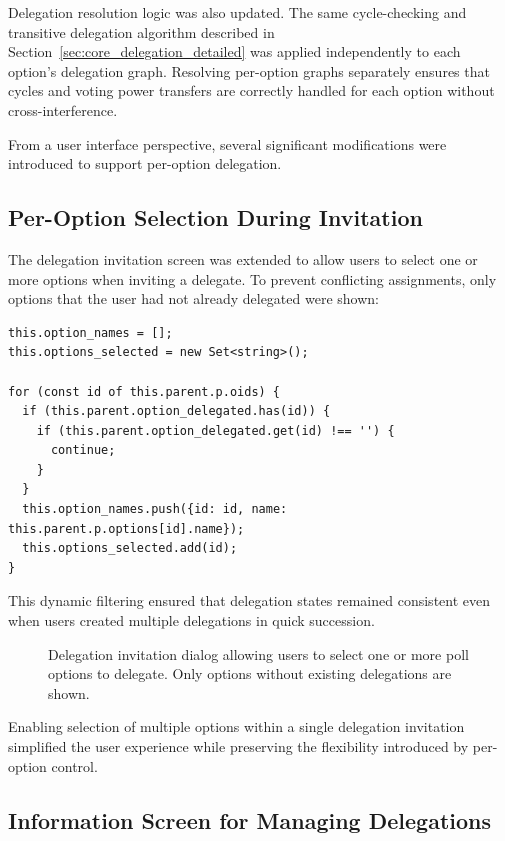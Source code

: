 Delegation resolution logic was also updated. The same cycle-checking and transitive delegation algorithm described in Section~\ref{sec:core_delegation_detailed} was applied independently to each option's delegation graph. Resolving per-option graphs separately ensures that cycles and voting power transfers are correctly handled for each option without cross-interference.

From a user interface perspective, several significant modifications were introduced to support per-option delegation.

\subsection{Per-Option Selection During Invitation}

The delegation invitation screen was extended to allow users to select one or more options when inviting a delegate. To prevent conflicting assignments, only options that the user had not already delegated were shown:

\begin{verbatim}
this.option_names = [];
this.options_selected = new Set<string>();

for (const id of this.parent.p.oids) {
  if (this.parent.option_delegated.has(id)) {
    if (this.parent.option_delegated.get(id) !== '') {
      continue;
    }
  }
  this.option_names.push({id: id, name: this.parent.p.options[id].name});
  this.options_selected.add(id);
}
\end{verbatim}

This dynamic filtering ensured that delegation states remained consistent even when users created multiple delegations in quick succession.

\begin{figure}[H]
  \centering
  \caption{Delegation invitation dialog allowing users to select one or more poll options to delegate. Only options without existing delegations are shown.}
  \label{fig:per-option-delegation-invite}
\end{figure}

Enabling selection of multiple options within a single delegation invitation simplified the user experience while preserving the flexibility introduced by per-option control.

\subsection{Information Screen for Managing Delegations}

